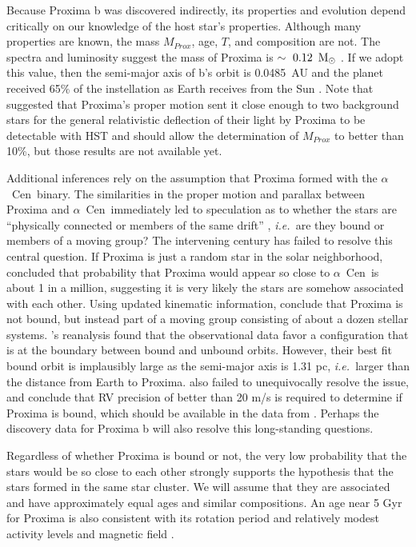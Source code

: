 \documentclass[preprint,12pt]{aastex}
\def\msun{{\rm\,M_\odot}}
\def\ie{{\it i.e.\ }}
\def\acen{{$\alpha$~Cen}}
\begin{document}
Because Proxima b was discovered indirectly, its properties and
evolution depend critically on our knowledge of the host star's
properties. Although many properties are known, the mass $M_{Prox}$,
age, $T$, and composition are not. The spectra and luminosity suggest
the mass of Proxima is $\sim~0.12~\msun$ \citep{Delfosse00}. If we
adopt this value, then the semi-major axis of b's orbit is 0.0485~AU
and the planet received 65\% of the instellation as Earth receives
from the Sun \cite{AngladaEscude16}.  Note that \cite{Sahu14}
suggested that Proxima's proper motion sent it close enough to two
background stars for the general relativistic deflection of their
light by Proxima to be detectable with HST and should allow the determination of
$M_{Prox}$ to better than 10\%, but those results are not available
yet.

Additional inferences rely on the assumption that Proxima formed with
the \acen~binary.  The similarities in the proper motion and parallax
between Proxima and \acen~immediately led to speculation as to whether
the stars are ``physically connected or members of the same drift''
\citep{Voute1917}, \ie are they bound or members of a moving group?
The intervening century has failed to resolve this central
question. If Proxima is just a random star in the solar neighborhood,
\cite{MatthewsGilmore93} concluded that probability that Proxima would
appear so close to \acen~is about 1 in a million, suggesting it is
very likely the stars are somehow associated with each other. Using
updated kinematic information, \citep{Anosova94} conclude that Proxima
is not bound, but instead part of a moving group consisting of about a
dozen stellar systems. \cite{WertheimerLaughlin06}'s reanalysis found
that the observational data favor a configuration that is at the
boundary between bound and unbound orbits. However, their best fit
bound orbit is implausibly large as the semi-major axis is 1.31 pc,
\ie larger than the distance from Earth to
Proxima. \cite{MatvienkoOrlov14} also failed to unequivocally resolve
the issue, and conclude that RV precision of better than 20 m/s is
required to determine if Proxima is bound, which should be available
in the data from \citep{AngladaEscude16}. Perhaps the discovery data
for Proxima b will also resolve this long-standing questions.

Regardless of whether Proxima is bound or not, the very low
probability that the stars would be so close to each other strongly
supports the hypothesis that the stars formed in the same star
cluster. We will assume that they are associated and have
approximately equal ages and similar compositions. An age near 5 Gyr
for Proxima is also consistent with its rotation period and relatively
modest activity levels and magnetic field \citep{ReinersBasri08}.
\end{document}
